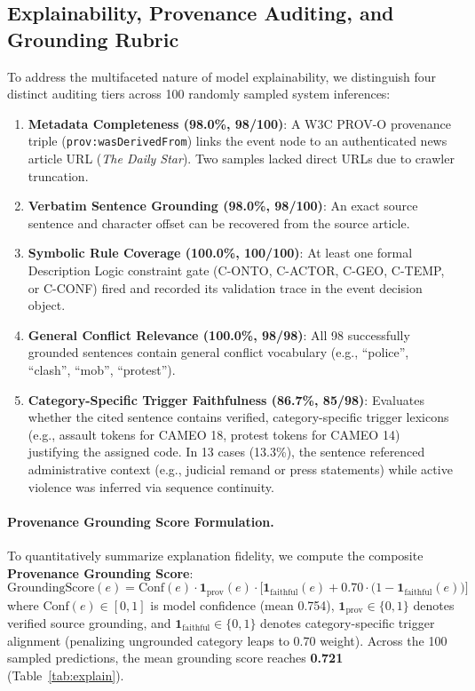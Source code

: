 \documentclass[11pt,a4paper]{article}
\begin{document}
\subsection{Explainability, Provenance Auditing, and Grounding Rubric}
\label{sec:explainability}

To address the multifaceted nature of model explainability, we distinguish four distinct auditing tiers across 100 randomly sampled system inferences:
\begin{enumerate}
  \item \textbf{Metadata Completeness (98.0\%, 98/100)}: A W3C PROV-O provenance triple (\texttt{prov:wasDerivedFrom}) links the event node to an authenticated news article URL (\textit{The Daily Star}). Two samples lacked direct URLs due to crawler truncation.
  \item \textbf{Verbatim Sentence Grounding (98.0\%, 98/100)}: An exact source sentence and character offset can be recovered from the source article.
  \item \textbf{Symbolic Rule Coverage (100.0\%, 100/100)}: At least one formal Description Logic constraint gate (C-ONTO, C-ACTOR, C-GEO, C-TEMP, or C-CONF) fired and recorded its validation trace in the event decision object.
  \item \textbf{General Conflict Relevance (100.0\%, 98/98)}: All 98 successfully grounded sentences contain general conflict vocabulary (e.g., ``police'', ``clash'', ``mob'', ``protest'').
  \item \textbf{Category-Specific Trigger Faithfulness (86.7\%, 85/98)}: Evaluates whether the cited sentence contains verified, category-specific trigger lexicons (e.g., assault tokens for CAMEO 18, protest tokens for CAMEO 14) justifying the assigned code. In 13 cases (13.3\%), the sentence referenced administrative context (e.g., judicial remand or press statements) while active violence was inferred via sequence continuity.
\end{enumerate}

\paragraph{Provenance Grounding Score Formulation.}
To quantitatively summarize explanation fidelity, we compute the composite \textbf{Provenance Grounding Score}:
\begin{equation}
\label{eq:grounding_score}
\text{GroundingScore}(e) = \text{Conf}(e) \cdot \mathbf{1}_{\text{prov}}(e) \cdot \Big[ \mathbf{1}_{\text{faithful}}(e) + 0.70 \cdot \big(1 - \mathbf{1}_{\text{faithful}}(e)\big) \Big]
\end{equation}
where $\text{Conf}(e) \in [0, 1]$ is model confidence (mean 0.754), $\mathbf{1}_{\text{prov}} \in \{0, 1\}$ denotes verified source grounding, and $\mathbf{1}_{\text{faithful}} \in \{0, 1\}$ denotes category-specific trigger alignment (penalizing ungrounded category leaps to 0.70 weight).
Across the 100 sampled predictions, the mean grounding score reaches \textbf{0.721} (Table~\ref{tab:explain}).
\end{document}
